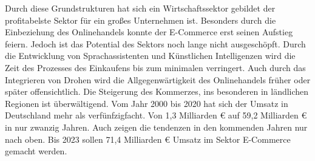 



Durch diese Grundstrukturen hat sich ein Wirtschaftssektor gebildet der profitabelste Sektor für ein großes Unternehmen ist. Besonders durch die Einbeziehung des Onlinehandels konnte der E-Commerce erst seinen Aufstieg feiern. Jedoch ist das Potential des Sektors noch lange nicht ausgeschöpft. Durch die Entwicklung von Sprachassistenten und Künstlichen Intelligenzen wird die Zeit des Prozesses des Einkaufens bis zum minimalen verringert. Auch durch das Integrieren von Drohen wird die Allgegenwärtigkeit des Onlinehandels früher oder später offensichtlich. %
Die Steigerung des Kommerzes, ins besonderen in ländlichen Regionen ist überwältigend. Vom Jahr 2000 bis 2020 hat sich der Umsatz in Deutschland mehr als verfünfzigfacht. Von 1,3 Milliarden € auf 59,2 Milliarden € in nur zwanzig Jahren. %
Auch zeigen die tendenzen in den kommenden Jahren nur nach oben. Bis 2023 sollen 71,4 Milliarden € Umsatz im Sektor E-Commerce gemacht werden.       
 
